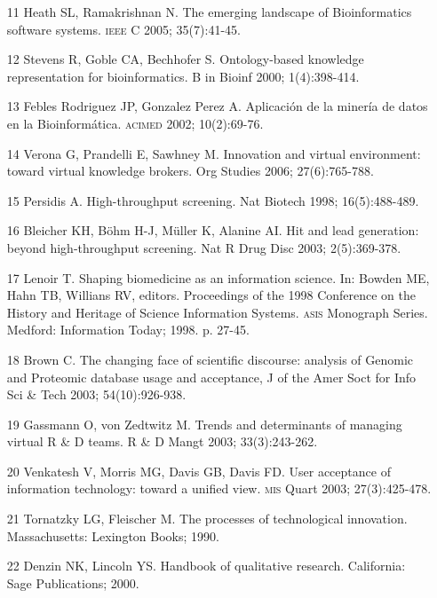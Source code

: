 \documentclass{article}
\begin{document}
\begin{itemize}
\item[11] Heath SL, Ramakrishnan N. The emerging landscape of Bioinformatics
software systems. \textsc{ieee} C 2005; 35(7):41-45.

\item[12] Stevens R, Goble CA, Bechhofer S. Ontology-based knowledge
representation for bioinformatics. B in Bioinf 2000; 1(4):398-414.

\item[13] Febles Rodriguez JP, Gonzalez Perez A. Aplicación de la minería de
datos en la Bioinformática. \textsc{acimed} 2002; 10(2):69-76.

\item[14] Verona G, Prandelli E, Sawhney M. Innovation and virtual
environment: toward virtual knowledge brokers. Org Studies 2006; 27(6):765-788.

\item[15] Persidis A. High-throughput screening. Nat Biotech 1998;
16(5):488-489.

\item[] 16 Bleicher KH, Böhm H-J, Müller K, Alanine AI. Hit and lead generation:
beyond high-throughput screening. Nat R Drug Disc 2003; 2(5):369-378.

\item[17] Lenoir T. Shaping biomedicine as an information science. In:
Bowden ME, Hahn TB, Willians RV, editors. Proceedings of the 1998 Conference on
the History and Heritage of Science Information Systems. \textsc{asis} Monograph Series.
Medford: Information Today; 1998. p. 27-45.

\item[18] Brown C. The changing face of scientific discourse: analysis of
Genomic and Proteomic database usage and acceptance, J of the Amer Soct for Info
Sci \& Tech 2003; 54(10):926-938.

\item[19] Gassmann O, von Zedtwitz M. Trends and determinants of managing
virtual R \& D teams. R \& D Mangt 2003; 33(3):243-262.

\item[20] Venkatesh V, Morris MG, Davis GB, Davis FD. User acceptance of
information technology: toward a unified view. \textsc{mis} Quart 2003; 27(3):425-478.

\item[21] Tornatzky LG, Fleischer M. The processes of technological
innovation. Massachusetts: Lexington Books; 1990.

\item[22] Denzin NK, Lincoln YS. Handbook of qualitative research.
California: Sage Publications; 2000.


\end{itemize}
\end{document}
